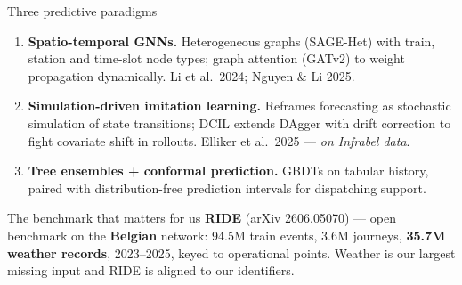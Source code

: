 \documentclass[aspectratio=169,10pt]{beamer}
\newcommand{\srcnote}[1]{{\scriptsize\color{ink3}#1}}
\newcommand{\hl}[1]{{\color{corange}\textbf{#1}}}
\begin{document}
\begin{frame}{Three predictive paradigms}
  \begin{enumerate}
    \item \textbf{Spatio-temporal GNNs.} Heterogeneous graphs (SAGE-Het) with train,
      station and time-slot node types; graph attention (GATv2) to weight propagation
      dynamically. \srcnote{Li et al.\ 2024; Nguyen \& Li 2025.}
    \item \textbf{Simulation-driven imitation learning.} Reframes forecasting as stochastic
      simulation of state transitions; DCIL extends DAgger with drift correction to fight
      covariate shift in rollouts. \srcnote{Elliker et al.\ 2025 --- \emph{on Infrabel data}.}
    \item \textbf{Tree ensembles + conformal prediction.} GBDTs on tabular history, paired
      with distribution-free prediction intervals for dispatching support.
  \end{enumerate}

  \vspace{1em}
  \begin{block}{\small The benchmark that matters for us}
    \small \textbf{RIDE} (arXiv 2606.05070) --- open benchmark on the \hl{Belgian} network:
    94.5M train events, 3.6M journeys, \hl{35.7M weather records}, 2023--2025, keyed to
    operational points. Weather is our largest missing input and RIDE is aligned to our
    identifiers.
  \end{block}
\end{frame}
\end{document}

